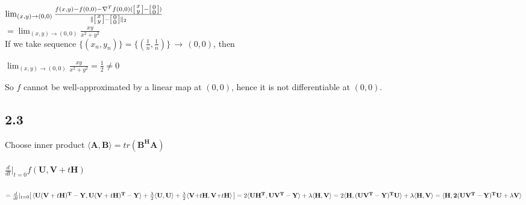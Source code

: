 \documentclass[12pt,a4paper,titlepage]{article}
\begin{document}
\newpage
\begin{flushleft}
$\lim_{(x,y)\to (0,0)}\frac{f(x,y)-f(0,0)-\nabla^T f(0,0)(\begin{bsmallmatrix}x\\y\end{bsmallmatrix}-\begin{bsmallmatrix}0\\0\end{bsmallmatrix})}{\|\begin{bsmallmatrix}x\\y\end{bsmallmatrix}-\begin{bsmallmatrix}0\\0\end{bsmallmatrix}\|_2}$\\
$=\lim_{(x,y)\to (0,0)}\frac{xy}{x^2+y^2}$\\ \vspace{1em}
If we take sequence $\{(x_n,y_n)\}=\{(\frac{1}{n},\frac{1}{n})\}\,\to\,(0,0)$, then\\
\end{flushleft}
\begin{center}
$\lim_{(x,y)\to (0,0)}\frac{xy}{x^2+y^2}=\frac{1}{2}\neq 0$
\end{center}
So $f$ cannot be well-approximated by a linear map at $(0,0)$, hence it is not differentiable at $(0,0)$.
	


\subsection*{2.3}
Choose inner product $\langle \mathbf{A,B}\rangle = tr(\mathbf{B^H A})$\\ \\
$\frac{d}{dt}|_{t=0}f(\mathbf{U,V}+t\mathbf{H})$\\\\ 
$= \frac{d}{dt}|_{t=0}[\,\langle \mathbf{U(V}+t\mathbf{H)^T-Y},
\mathbf{U(V}+t\mathbf{H)^T-Y}\rangle + \frac{\lambda}{2}\langle \mathbf{U,U}\rangle
+ \frac{\lambda}{2}\langle \mathbf{V+}t\mathbf{H,V+}t\mathbf{H}\rangle\,]\\\\
 = 2\langle \mathbf{UH^T,UV^T-Y}\rangle + \lambda\langle \mathbf{H,V}\rangle\\\\
 = 2\langle \mathbf{H,(UV^T-Y)^T U}\rangle + \lambda\langle \mathbf{H,V}\rangle\\\\
 = \langle \mathbf{H,2(UV^T-Y)^T U+\lambda\mathbf{V}}\rangle$\\
 
\end{document}

